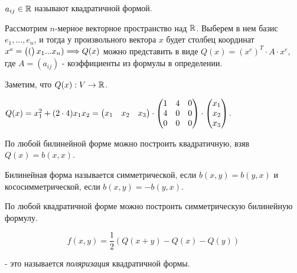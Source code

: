 \documentclass[../main.tex]{subfiles}
\begin{document}
$a_{ij}\in\mathbb{R}$ называют квадратичной формой.

\void
Рассмотрим $n$-мерное векторное пространство над $\mathbb{R}$. Выберем в нем базис $e_1,...,e_n$, и тогда
у произвольного вектора $x$ будет столбец координат $x^e = \begin{pmatrix} (\end{pmatrix}x_1\\.\\.\\.\\x_n) \Longrightarrow
Q(x)$ можно представить в виде $Q(x) = (x^e)^T\cdot A\cdot x^e$, где $A = (a_{ij})$ - коэффициенты из
формулы в определении.

\void
Заметим, что $Q(x): V\rightarrow \mathbb{R}$.

\void{} $Q(x) = x^2_1 + (2\cdot 4)x_1x_2 = \begin{pmatrix} x_1 & x_2 & x_3\end{pmatrix}\cdot\begin{pmatrix} 1&4&0\\4&0&0\\0&0&0\end{pmatrix}\cdot\begin{pmatrix} x_1\\x_2\\x_3\end{pmatrix}$.

\void{} По любой билинейной форме можно построить квадратичную, взяв $Q(x) = b(x, x)$.

\void{} Билинейная форма называется симметрической, если $b(x,y) = b(y,x)$ и кососимметрической,
если $b(x,y) = -b(y, x)$.

\void{} По любой квадратичной форме можно построить симметрическую билинейную формулу.

$$ f(x,y) = \frac{1}{2} (Q(x+y) - Q(x) - Q(y)) $$

- это называется \textit{поляризация} квадратичной формы.
\end{document}
